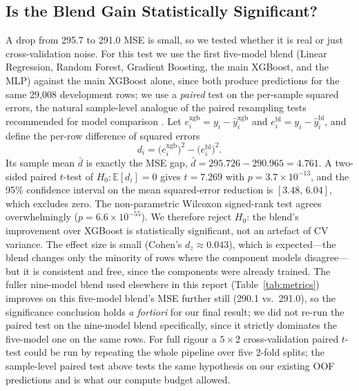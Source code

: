 \documentclass[journal]{IEEEtran}
\begin{document}
\subsection{Is the Blend Gain Statistically Significant?}
\label{sec:significance}
A drop from 295.7 to 291.0 MSE is small, so we tested whether it is real or
just cross-validation noise. For this test we use the first five-model blend
(Linear Regression, Random Forest, Gradient Boosting, the main XGBoost, and the
MLP) against the main XGBoost alone, since both produce predictions for the
same 29{,}008 development rows; we use a \emph{paired} test on the per-sample
squared errors, the natural sample-level analogue of the paired resampling
tests recommended for model comparison \cite{dietterich1998}. Let
$e_i^{\text{xgb}}=y_i-\hat y_i^{\text{xgb}}$ and
$e_i^{\text{bl}}=y_i-\hat y_i^{\text{bl}}$, and define the per-row difference of
squared errors
\begin{equation}
d_i=\big(e_i^{\text{xgb}}\big)^{2}-\big(e_i^{\text{bl}}\big)^{2}.
\label{eq:diff}
\end{equation}
Its sample mean $\bar d$ is exactly the MSE gap, $\bar d = 295.726-290.965=4.761$.
A two-sided paired $t$-test of $H_0:\mathbb{E}[d_i]=0$ gives $t=7.269$ with
$p=3.7\times10^{-13}$, and the 95\% confidence interval on the mean
squared-error reduction is $[3.48,\,6.04]$, which excludes zero. The
non-parametric Wilcoxon signed-rank test agrees overwhelmingly
($p=6.6\times10^{-55}$). We therefore reject $H_0$: the blend's improvement
over XGBoost is statistically significant, not an artefact of CV variance. The
effect size is small (Cohen's $d_z\approx0.043$), which is expected---the blend
changes only the minority of rows where the component models disagree---but it
is consistent and free, since the components were already trained. The fuller
nine-model blend used elsewhere in this report (Table~\ref{tab:metrics})
improves on this five-model blend's MSE further still (290.1 vs.\ 291.0), so
the significance conclusion holds \emph{a fortiori} for our final result; we
did not re-run the paired test on the nine-model blend specifically, since it
strictly dominates the five-model one on the same rows. For full rigour a
$5\times2$ cross-validation paired $t$-test \cite{dietterich1998} could be run
by repeating the whole pipeline over five $2$-fold splits; the sample-level
paired test above tests the same hypothesis on our existing OOF predictions and
is what our compute budget allowed.
\end{document}
